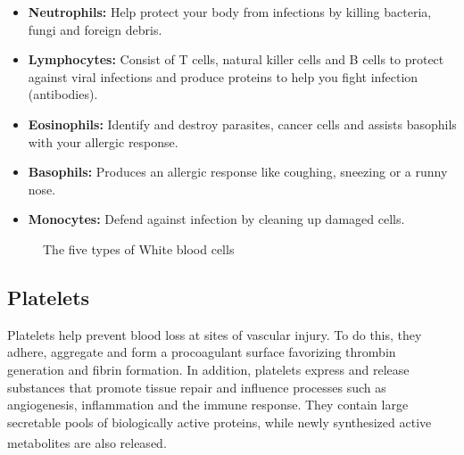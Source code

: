 \begin{itemize}
  \item \textbf{Neutrophils:} Help protect your body from infections by killing bacteria, fungi and foreign debris.
  \item \textbf{Lymphocytes:} Consist of T cells, natural killer cells and B cells to protect against viral infections and produce proteins to help you fight infection (antibodies).
  \item \textbf{Eosinophils:} Identify and destroy parasites, cancer cells and assists basophils with your allergic response.
  \item \textbf{Basophils:} Produces an allergic response like coughing, sneezing or a runny nose.
  \item \textbf{Monocytes:} Defend against infection by cleaning up damaged cells.
\end{itemize}

\newpage

\begin{figure}[H]
\centering
  \vspace{-0.1in}
    \centerline{}
    \caption{The five types of White blood cells}
\end{figure}

\subsection{Platelets}

Platelets help prevent blood loss at sites of vascular injury. To do this, they adhere, aggregate and form a procoagulant surface favorizing thrombin generation and fibrin formation. In addition, platelets express and release substances that promote tissue repair and influence processes such as angiogenesis, inflammation and the immune response. They contain large secretable pools of biologically active proteins, while newly synthesized active metabolites are also released. \textsuperscript{\cite{nurden2008platelets}}

